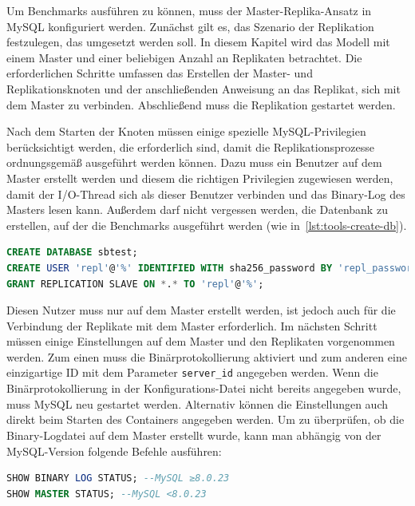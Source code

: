 Um Benchmarks ausführen zu können, muss der Master-Replika-Ansatz in MySQL konfiguriert werden.
Zunächst gilt es, das Szenario der Replikation festzulegen, das umgesetzt werden soll.
In diesem Kapitel wird das Modell mit einem Master und einer beliebigen Anzahl an Replikaten betrachtet.
Die erforderlichen Schritte umfassen das Erstellen der Master- und Replikationsknoten und der anschließenden Anweisung an das Replikat, sich mit dem Master zu verbinden.
Abschließend muss die Replikation gestartet werden.

Nach dem Starten der Knoten müssen einige spezielle MySQL-Privilegien berücksichtigt werden, die erforderlich sind, damit die Replikationsprozesse ordnungsgemäß ausgeführt werden können.
Dazu muss ein Benutzer auf dem Master erstellt werden und diesem die richtigen Privilegien zugewiesen werden, damit der I/O-Thread sich als dieser Benutzer verbinden und das Binary-Log des Masters lesen kann.
Außerdem darf nicht vergessen werden, die Datenbank zu erstellen, auf der die Benchmarks ausgeführt werden (wie in~\ref{lst:tools-create-db}).

\vspace{-7pt}
\begin{lstlisting}[language=SQL,caption=Datenbank- und Nutzererstellung sowie Rechtevergabe,label={lst:replication-privileges}]
CREATE DATABASE sbtest;
CREATE USER 'repl'@'%' IDENTIFIED WITH sha256_password BY 'repl_password';
GRANT REPLICATION SLAVE ON *.* TO 'repl'@'%';
\end{lstlisting}
\vspace{-5pt}

Diesen Nutzer muss nur auf dem Master erstellt werden, ist jedoch auch für die Verbindung der Replikate mit dem Master erforderlich.
Im nächsten Schritt müssen einige Einstellungen auf dem Master und den Replikaten vorgenommen werden.
Zum einen muss die Binärprotokollierung aktiviert und zum anderen eine einzigartige ID mit dem Parameter \texttt{server\_id} angegeben werden.
Wenn die Binärprotokollierung in der Konfigurations-Datei nicht bereits angegeben wurde, muss MySQL neu gestartet werden.
Alternativ können die Einstellungen auch direkt beim Starten des Containers angegeben werden.
Um zu überprüfen, ob die Binary-Logdatei auf dem Master erstellt wurde, kann man abhängig von der MySQL-Version folgende Befehle ausführen:

\vspace{-7pt}
\begin{lstlisting}[language=SQL,caption=Anzeige der Konfiguration,label={lst:replication-master-config},style=custom_daniel]
SHOW BINARY LOG STATUS; --MySQL ≥8.0.23
SHOW MASTER STATUS; --MySQL <8.0.23
\end{lstlisting}
\vspace{-5pt}

